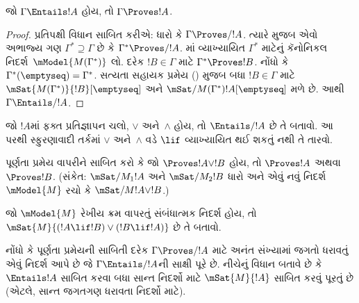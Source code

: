 \begingroup
\makeatletter{}\makeatother


\label{guunit:OLP-0509}


\begin{thm}
  જો $\Gamma \Entails !A$ હોય, તો $\Gamma \Proves !A$.
\end{thm}

\begin{proof}
  પ્રતિપક્ષી વિધાન સાબિત કરીએ: ધારો કે $\Gamma \Proves/ !A$.
  ત્યારે  મુજબ એવો અભાજ્ય ગણ
  $\Gamma^* \supseteq \Gamma$ છે કે $\Gamma^* \Proves/ !A$.
  માં વ્યાખ્યાયિત
  $\Gamma^*$ માટેનું કૅનોનિકલ નિદર્શ~$\mModel{M(\Gamma^*)}$
  લો. દરેક $!B \in \Gamma$ માટે $\Gamma^* \Proves !B$.
  નોંધો કે $\Gamma^*(\emptyseq) = \Gamma^*$.
  સત્યતા સહાયક પ્રમેય () મુજબ
  બધા $!B \in \Gamma$ માટે
  $\mSat{M(\Gamma^*)}{!B}[\emptyseq]$ અને
  $\mSat/{M(\Gamma^*)}{!A}[\emptyseq]$ મળે છે.
  આથી $\Gamma \Entails/ !A$.
\end{proof}

\begin{prob}
  જો $!A$માં ફક્ત પ્રતિજ્ઞાપન ચલો, $\lor$
  અને~$\land$ હોય, તો $\Entails/ !A$ છે તે બતાવો.
  આ પરથી સ્ફુરણાવાદી તર્કમાં $\lor$ અને~$\land$
  વડે $\lif$ વ્યાખ્યાયિત થઈ શકતું નથી તે તારવો.
\end{prob}

\begin{prob}
  પૂર્ણતા પ્રમેય વાપરીને સાબિત કરો કે જો
  $\Proves !A \lor !B$ હોય, તો $\Proves !A$ અથવા
  $\Proves !B$. (સંકેત: $\mSat/{M_1}{!A}$ અને
  $\mSat/{M_2}{!B}$ ધારો અને એવું નવું નિદર્શ
  $\mModel{M}$ રચો કે $\mSat/{M}{!A \lor !B}$.)
\end{prob}

\begin{prob}
  જો $\mModel{M}$ રેખીય ક્રમ વાપરતું સંબંધાત્મક
  નિદર્શ હોય, તો
  $\mSat{M}{(!A \lif !B)\lor(!B \lif !A)}$
  છે તે બતાવો.
\end{prob}
\endgroup

\begingroup
\makeatletter{}\makeatother


\label{guunit:OLP-0510}

નોંધો કે પૂર્ણતા પ્રમેયની સાબિતી દરેક
$\Gamma \Proves/ !A$ માટે અનંત સંખ્યામાં જગતો ધરાવતું
એવું નિદર્શ આપે છે જે $\Gamma \Entails/ !A$ની સાક્ષી
પૂરે છે. નીચેનું વિધાન બતાવે છે કે $\Entails !A$
સાબિત કરવા બધા સાન્ત નિદર્શો માટે
$\mSat{M}{!A}$ સાબિત કરવું પૂરતું છે (એટલે, સાન્ત
જગતગણ ધરાવતા નિદર્શો માટે).


